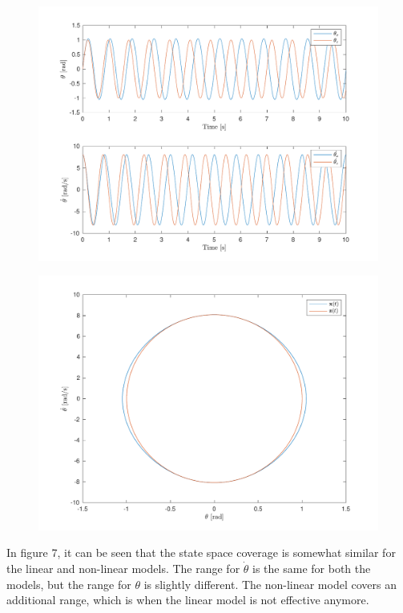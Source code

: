 \documentclass[10pt]{article}
\begin{document}
\begin{figure}[ht]
    \centering
    \begin{minipage}[b]{0.45\textwidth}
        \centering
        \includegraphics[width=1\linewidth]{lab1/figs/section5_X0_1_state_evolution.pdf}
    \end{minipage}
    \begin{minipage}[b]{0.45\textwidth}
        \centering
        \includegraphics[width=1\linewidth]{lab1/figs/section5_X0_1_state_orbit.pdf}
        \label{fig:test2}
    \end{minipage}
    
    \label{figure:X_0_1_state_evolution}
\end{figure}
    In figure 7, it can be seen that the state space coverage is somewhat similar for the linear and non-linear models. The range for $\dot{\theta}$ is the same for both the models, but the range for $\theta$ is slightly different. The non-linear model covers an additional range, which is when the linear model is not effective anymore.
    
\end{document}
